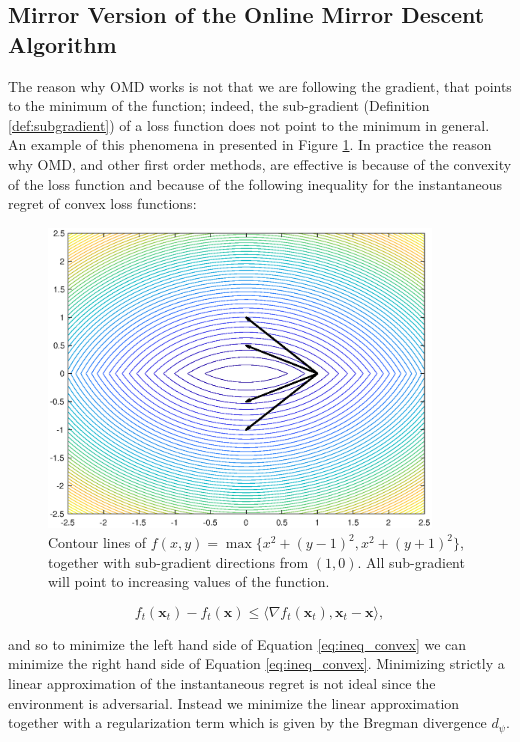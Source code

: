 \subsection{Mirror Version of the Online Mirror Descent Algorithm} \label{sec:mirror_version}

The reason why OMD works is not that we are following the gradient, that points to the minimum of the function; indeed, the sub-gradient (Definition \ref{def:subgradient}) of a loss function does not point to the minimum in general. An example of this phenomena in presented in Figure \ref{fig_no_grad}. In practice the reason why OMD, and other first order methods, are effective is because of the convexity of the loss function and because of the following inequality for the instantaneous regret of convex loss functions:

\begin{figure}[!ht]
\begin{center}
\includegraphics[width=4in,keepaspectratio]{./img/no_grad.eps}
\caption{Contour lines of $f(x,y)=\max\{x^2+(y-1)^2,x^2+(y+1)^2\}$, together with sub-gradient directions from $(1,0)$. All sub-gradient will point to increasing values of the function.}
\label{fig_no_grad}
\end{center}
\end{figure}

\begin{equation}\label{eq:ineq_convex}
f_t(\mathbf x_t)-f_t(\mathbf x)\le\langle\nabla f_t(\mathbf x_t),\mathbf x_t-\mathbf x\rangle,
\end{equation}

and so to minimize the left hand side of Equation \eqref{eq:ineq_convex} we can minimize the right hand side of Equation \eqref{eq:ineq_convex}. Minimizing strictly a linear approximation of the instantaneous regret is not ideal since the environment is adversarial. Instead we minimize the linear approximation together with a regularization term which is given by the Bregman divergence $d_\psi$.

